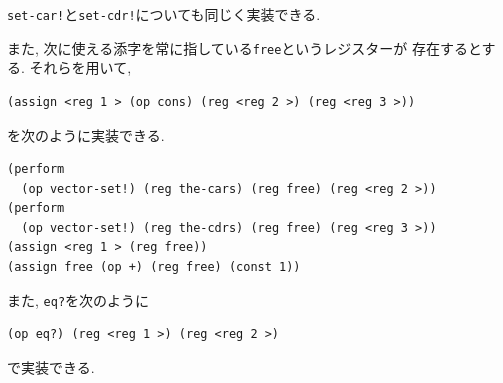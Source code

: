 \lstinline{set-car!}と\lstinline{set-cdr!}についても同じく実装できる.

また, 次に使える添字を常に指している\lstinline{free}というレジスターが%
存在するとする. それらを用いて,

\begin{lstlisting}[basicstyle=\footnotesize]
(assign <reg 1 > (op cons) (reg <reg 2 >) (reg <reg 3 >))
\end{lstlisting}
を次のように実装できる.
\begin{lstlisting}[basicstyle=\footnotesize]
(perform
  (op vector-set!) (reg the-cars) (reg free) (reg <reg 2 >))
(perform
  (op vector-set!) (reg the-cdrs) (reg free) (reg <reg 3 >))
(assign <reg 1 > (reg free))
(assign free (op +) (reg free) (const 1))
\end{lstlisting}

また, \lstinline{eq?}を次のように

\begin{lstlisting}[basicstyle=\footnotesize]
(op eq?) (reg <reg 1 >) (reg <reg 2 >)
\end{lstlisting}

で実装できる.